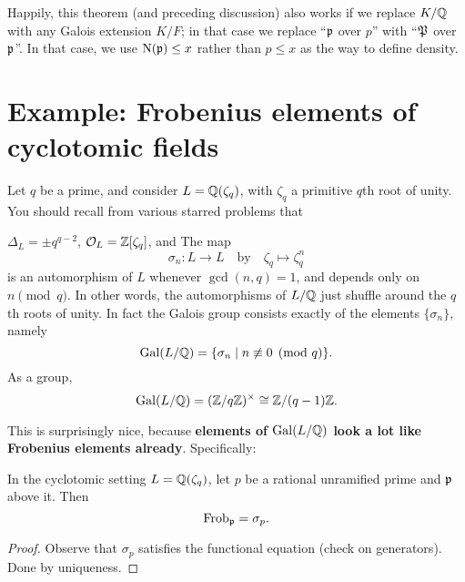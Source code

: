 \begin{remark}
Happily, this theorem (and preceding discussion)
also works if we replace $K/\mathbb Q$ with any Galois extension $K/F$;
in that case we replace ``$\mathfrak p$ over $p$'' with ``$\mathfrak P$ over $\mathfrak p$''.
In that case, we use $\operatorname{N}(\mathfrak p) \le x$ rather than $p \le x$ as the way
to define density.
\end{remark}

\section{Example: Frobenius elements of cyclotomic fields}
Let $q$ be a prime, and consider $L = \mathbb Q(\zeta_q)$,
with $\zeta_q$ a primitive $q$th root of unity.
You should recall from various starred problems that
\begin{itemize}
	\ii $\Delta_L = \pm q^{q-2}$,
	\ii $\mathcal O_L = \mathbb Z[\zeta_q]$, and
	\ii The map \[ \sigma_n \colon L \to L \quad\text{by}\quad \zeta_q \mapsto \zeta_q^n \]
	is an automorphism of $L$ whenever $\gcd(n,q)=1$,
	and depends only on $n \pmod q$.
	In other words, the automorphisms of $L/\mathbb Q$ just shuffle around the $q$th roots of unity.
	In fact the Galois group consists exactly of the elements $\{\sigma_n\}$, namely
	\[ \operatorname{Gal}(L/\mathbb Q) = \{ \sigma_n \mid n \not\equiv 0 \pmod q \}. \]
	As a group, \[ \operatorname{Gal}(L/\mathbb Q) = (\mathbb Z/q\mathbb Z)^\times \cong \mathbb Z/(q-1)\mathbb Z. \]
\end{itemize}
This is surprisingly nice,
because \textbf{elements of $\operatorname{Gal}(L/\mathbb Q)$ look a lot
like Frobenius elements already}.
Specifically:

\begin{lemma}
	\label{lem:cyclo_frob}
	In the cyclotomic setting $L = \mathbb Q(\zeta_q)$,
	let $p$ be a rational unramified prime
	and $\mathfrak p$ above it. Then \[ \mathrm{Frob}_\mathfrak p = \sigma_p. \]
\end{lemma}
\begin{proof}
	Observe that $\sigma_p$ satisfies the functional equation
	(check on generators).
	Done by uniqueness.
%
\end{proof}

